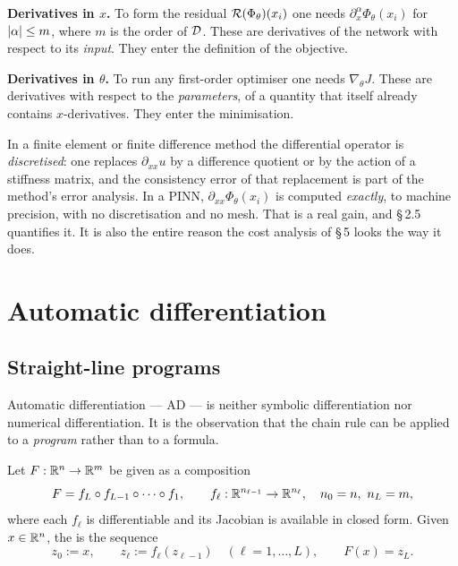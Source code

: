 \documentclass[11pt,a4paper]{article}
\begin{document}
\begin{keybox}
\textbf{Derivatives in $x$.} To form the residual $\mathcal{R}(\Phi_\theta)(x_i)$ one needs
$\partial^\alpha_x \Phi_\theta(x_i)$ for $\left\lvert \alpha \right\rvert \le m$, where $m$ is the order of $\mathcal{D}$.
These are derivatives of the network with respect to its \emph{input}. They enter the definition of
the objective.

\smallskip
\textbf{Derivatives in $\theta$.} To run any first-order optimiser one needs $\nabla_\theta J$.
These are derivatives with respect to the \emph{parameters}, of a quantity that itself already
contains $x$-derivatives. They enter the minimisation.
\end{keybox}

\begin{remark}
In a finite element or finite difference method the differential operator is \emph{discretised}: one
replaces $\partial_{xx}u$ by a difference quotient or by the action of a stiffness matrix, and the
consistency error of that replacement is part of the method's error analysis. In a PINN,
$\partial_{xx}\Phi_\theta(x_i)$ is computed \emph{exactly}, to machine precision, with no
discretisation and no mesh. That is a real gain, and §\,2.5 quantifies it. It is also the entire
reason the cost analysis of §\,5 looks the way it does.
\end{remark}

\section{Automatic differentiation}

\subsection{Straight-line programs}

Automatic differentiation --- AD --- is neither symbolic differentiation nor numerical
differentiation. It is the observation that the chain rule can be applied to a \emph{program} rather
than to a formula.

\begin{definition}\label{def:trace}
Let $F : \mathbb{R}^{n} \to \mathbb{R}^{m}$ be given as a composition
\[
F = f_L \circ f_{L-1} \circ \cdots \circ f_1,
\qquad f_\ell : \mathbb{R}^{n_{\ell-1}} \to \mathbb{R}^{n_\ell},\quad n_0 = n,\ n_L = m,
\]
where each $f_\ell$ is differentiable and its Jacobian is available in closed form. Given
$x \in \mathbb{R}^n$, the  is the sequence
\[
z_0 := x, \qquad z_\ell := f_\ell(z_{\ell-1}) \quad (\ell = 1,\dots,L), \qquad F(x) = z_L .
\]
\end{definition}
\end{document}
